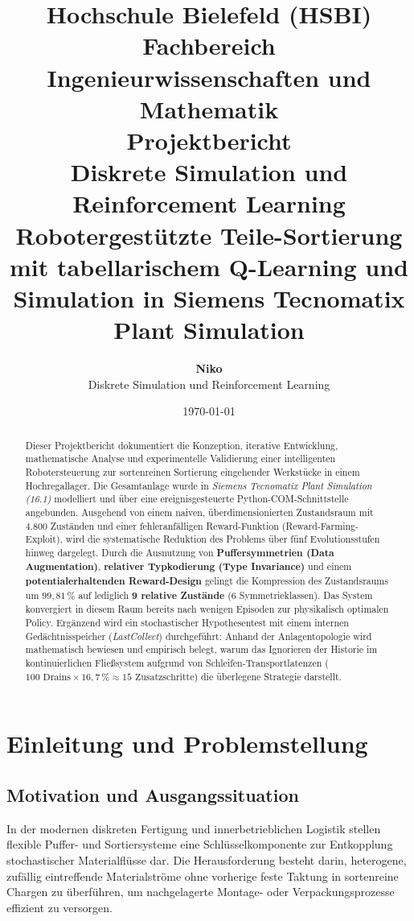 \documentclass[11pt,a4paper]{article}
\title{%
  \vspace{-1.5cm}
  \textbf{\LARGE Hochschule Bielefeld (HSBI)}\\[0.3em]
  \large Fachbereich Ingenieurwissenschaften und Mathematik\\[1.5em]
  \textbf{\huge Projektbericht}\\[0.5em]
  \Large Diskrete Simulation und Reinforcement Learning\\[1.2em]
  \textbf{\LARGE Robotergestützte Teile-Sortierung mit tabellarischem Q-Learning und Simulation in Siemens Tecnomatix Plant Simulation}\\[1.5em]
}
\author{%
  \textbf{Niko}\\[0.5em]
  \small Diskrete Simulation und Reinforcement Learning
}
\date{\today}
\begin{document}
\maketitle
\thispagestyle{empty}

\begin{abstract}
\noindent
Dieser Projektbericht dokumentiert die Konzeption, iterative Entwicklung, mathematische Analyse und experimentelle Validierung einer intelligenten Robotersteuerung zur sortenreinen Sortierung eingehender Werkstücke in einem Hochregallager. Die Gesamtanlage wurde in \textit{Siemens Tecnomatix Plant Simulation (16.1)} modelliert und über eine ereignisgesteuerte Python-COM-Schnittstelle angebunden. 
Ausgehend von einem naiven, überdimensionierten Zustandsraum mit $4.800$ Zuständen und einer fehleranfälligen Reward-Funktion (Reward-Farming-Exploit), wird die systematische Reduktion des Problems über fünf Evolutionsstufen hinweg dargelegt. Durch die Ausnutzung von \textbf{Puffersymmetrien (Data Augmentation)}, \textbf{relativer Typkodierung (Type Invariance)} und einem \textbf{potentialerhaltenden Reward-Design} gelingt die Kompression des Zustandsraums um $99{,}81\,\%$ auf lediglich \textbf{9 relative Zustände} (6 Symmetrieklassen). Das System konvergiert in diesem Raum bereits nach wenigen Episoden zur physikalisch optimalen Policy. 
Ergänzend wird ein stochastischer Hypothesentest mit einem internen Gedächtnisspeicher (\textit{LastCollect}) durchgeführt: Anhand der Anlagentopologie wird mathematisch bewiesen und empirisch belegt, warum das Ignorieren der Historie im kontinuierlichen Fließsystem aufgrund von Schleifen-Transportlatenzen ($100 \text{ Drains} \times 16{,}7\,\% \approx 15 \text{ Zusatzschritte}$) die überlegene Strategie darstellt.
\end{abstract}

\clearpage
\tableofcontents
\clearpage

\section{Einleitung und Problemstellung}

\subsection{Motivation und Ausgangssituation}
In der modernen diskreten Fertigung und innerbetrieblichen Logistik stellen flexible Puffer- und Sortiersysteme eine Schlüsselkomponente zur Entkopplung stochastischer Materialflüsse dar. Die Herausforderung besteht darin, heterogene, zufällig eintreffende Materialströme ohne vorherige feste Taktung in sortenreine Chargen zu überführen, um nachgelagerte Montage- oder Verpackungsprozesse effizient zu versorgen.
\end{document}
